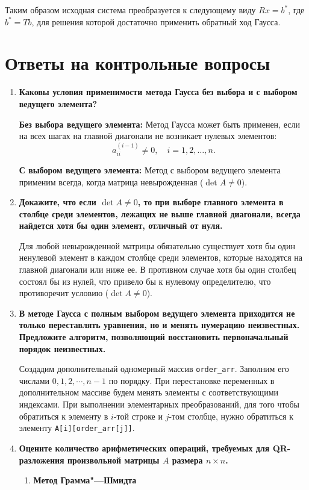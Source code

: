 \documentclass[12pt, a4paper]{article}
\begin{document}
Таким образом исходная система преобразуется к следующему виду $Rx=b^{*}$, где $b^{*}=Tb$, для решения которой достаточно применить обратный ход Гаусса. 

	\section{Ответы на контрольные вопросы}
	\begin{enumerate}
		\item \textbf{Каковы условия применимости метода Гаусса без выбора
			и с выбором ведущего элемента?}
		
		\textbf{Без выбора ведущего элемента:} Метод Гаусса может быть применен, если на всех шагах на главной диагонали не возникает нулевых элементов: $$a^{(i-1)}_{ii}\ne 0, \quad  i = 1,2,\ldots,n.$$
		
		\textbf {С выбором ведущего элемента:} Метод с выбором ведущего элемента  применим всегда, когда матрица невырожденная ($\det A \ne 0$).
		
		\item \textbf{Докажите, что если $\det A \ne 0$, то при выборе главного
			элемента в столбце среди элементов, лежащих не выше главной диагонали, всегда найдется хотя бы один элемент, отличный от нуля.}
		
		Для любой невырожденной матрицы обязательно существует хотя бы один ненулевой элемент в каждом столбце среди элементов, которые находятся на главной диагонали или ниже ее. В противном случае хотя бы один столбец состоял бы из нулей, что привело бы к нулевому определителю, что противоречит условию ($\det A \ne 0$).
		
		
		\item \textbf{В методе Гаусса с полным выбором ведущего элемента приходится не только переставлять уравнения, но и менять нумерацию неизвестных. Предложите алгоритм, позволяющий восстановить первоначальный порядок неизвестных.}
		
		Создадим дополнительный одномерный массив \texttt{order\_arr}. Заполним его числами $0,1,2,\cdots, n-1$ по порядку. При перестановке переменных в дополнительном массиве будем менять элементы с соответствующими индексами. При выполнении элементарных преобразований, для того чтобы обратиться  к элементу в $i$-той строке и $j$-том столбце, нужно обратиться к элементу \texttt{A[i][order\_arr[j]]}.
		
		\item \textbf{Оцените количество арифметических операций, требуемых
			для QR-разложения произвольной матрицы $A$ размера $n \times n$.}
		\begin{enumerate}
			\item \textbf{ Метод Грамма"---Шмидта}
			

\end{enumerate}
\end{enumerate}
\end{document}

